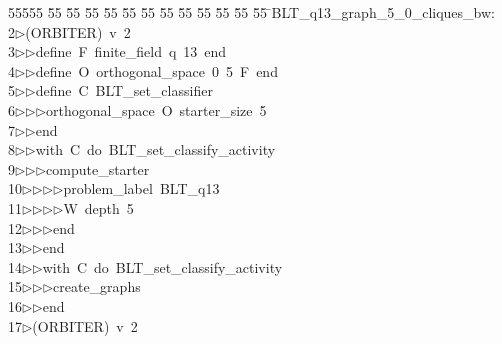 %
%
\begin{tabbing}
55555 \= 55 \= 55 \= 55 \= 55 \= 55 \= 55 \= 55 \= 55 \= 55 \= 55 \= 55 \= 55 \= \>BLT\_q13\_graph\_5\_0\_cliques\_bw:\\[0pt]
2\>$\triangleright$\>(ORBITER)\ v\ 2\ \\[0pt]
3\>$\triangleright$\>$\triangleright$\>define\ F\ finite\_field\ q\ 13\ end\ \\[0pt]
4\>$\triangleright$\>$\triangleright$\>define\ O\ orthogonal\_space\ 0\ 5\ F\ end\ \\[0pt]
5\>$\triangleright$\>$\triangleright$\>define\ C\ BLT\_set\_classifier\ \\[0pt]
6\>$\triangleright$\>$\triangleright$\>$\triangleright$\>orthogonal\_space\ O\ starter\_size\ 5\ \\[0pt]
7\>$\triangleright$\>$\triangleright$\>end\ \\[0pt]
8\>$\triangleright$\>$\triangleright$\>with\ C\ do\ BLT\_set\_classify\_activity\ \\[0pt]
9\>$\triangleright$\>$\triangleright$\>$\triangleright$\>compute\_starter\ \\[0pt]
10\>$\triangleright$\>$\triangleright$\>$\triangleright$\>$\triangleright$\>problem\_label\ BLT\_q13\ \\[0pt]
11\>$\triangleright$\>$\triangleright$\>$\triangleright$\>$\triangleright$\>W\ depth\ 5\ \\[0pt]
12\>$\triangleright$\>$\triangleright$\>$\triangleright$\>end\ \\[0pt]
13\>$\triangleright$\>$\triangleright$\>end\ \\[0pt]
14\>$\triangleright$\>$\triangleright$\>with\ C\ do\ BLT\_set\_classify\_activity\ \\[0pt]
15\>$\triangleright$\>$\triangleright$\>$\triangleright$\>create\_graphs\ \\[0pt]
16\>$\triangleright$\>$\triangleright$\>end\\[0pt]
17\>$\triangleright$\>(ORBITER)\ v\ 2\ \\[0pt]

\end{tabbing}
